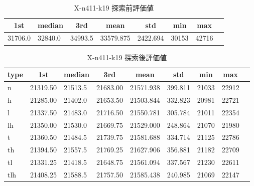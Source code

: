 \begin{table}[htbp]
    \centering
    \caption{X-n411-k19 探索前評価値}
    \begin{tabular}{|l|l|l|l|l|l|l|l|}\hline
    \multicolumn{1}{|c|}{\textbf{1st}}
    &\multicolumn{1}{c|}{\textbf{median}}
    &\multicolumn{1}{c|}{\textbf{3rd}}
    &\multicolumn{1}{c|}{\textbf{mean}}
    &\multicolumn{1}{c|}{\textbf{std}}
    &\multicolumn{1}{c|}{\textbf{min}}
    &\multicolumn{1}{c|}{\textbf{max}}\\\hline
	31706.0 & 32840.0 & 34993.5 & 33579.875 & 2422.694 & 30153 & 42716\\\hline
	\end{tabular}
\end{table}
\begin{table}[htbp]
    \centering
    \caption{X-n411-k19 探索後評価値}
    \begin{tabular}{|l|l|l|l|l|l|l|l|l|}\hline
    \multicolumn{1}{|c|}{\textbf{type}}
    &\multicolumn{1}{|c|}{\textbf{1st}}
    &\multicolumn{1}{c|}{\textbf{median}}
    &\multicolumn{1}{c|}{\textbf{3rd}}
    &\multicolumn{1}{c|}{\textbf{mean}}
    &\multicolumn{1}{c|}{\textbf{std}}
    &\multicolumn{1}{c|}{\textbf{min}}
    &\multicolumn{1}{c|}{\textbf{max}}\\\hline
	n & 21319.50 & 21513.5 & 21683.00 & 21571.938 & 399.811 & 21033 & 22912\\\hline
	h & 21285.00 & 21402.0 & 21653.50 & 21503.844 & 332.823 & 20981 & 22721\\\hline
	l & 21337.50 & 21483.0 & 21716.50 & 21550.781 & 305.784 & 21011 & 22354\\\hline
	lh & 21350.00 & 21530.0 & 21669.75 & 21529.000 & 248.864 & 21070 & 21980\\\hline
	t & 21360.50 & 21484.5 & 21739.75 & 21581.688 & 334.714 & 21125 & 22786\\\hline
	th & 21394.50 & 21557.5 & 21769.25 & 21627.906 & 356.881 & 21182 & 22709\\\hline
	tl & 21331.25 & 21418.5 & 21648.75 & 21561.094 & 337.567 & 21230 & 22611\\\hline
	tlh & 21408.25 & 21588.5 & 21757.50 & 21585.438 & 240.985 & 21069 & 22147\\\hline
	\end{tabular}
\end{table}

